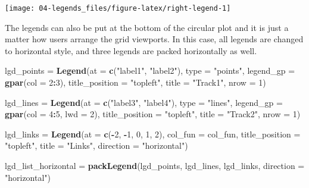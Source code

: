 \documentclass[]{book}
\newenvironment{Shaded}{\begin{snugshade}}{\end{snugshade}}
\newcommand{\KeywordTok}[1]{\textcolor[rgb]{0.13,0.29,0.53}{\textbf{#1}}}
\newcommand{\DataTypeTok}[1]{\textcolor[rgb]{0.13,0.29,0.53}{#1}}
\newcommand{\DecValTok}[1]{\textcolor[rgb]{0.00,0.00,0.81}{#1}}
\newcommand{\StringTok}[1]{\textcolor[rgb]{0.31,0.60,0.02}{#1}}
\newcommand{\OperatorTok}[1]{\textcolor[rgb]{0.81,0.36,0.00}{\textbf{#1}}}
\newcommand{\NormalTok}[1]{#1}
\theoremstyle{definition}
\theoremstyle{definition}
\theoremstyle{remark}
\begin{document}
\begin{center}\texttt{[image: 04-legends\_files/figure-latex/right-legend-1]} \end{center}

The legends can also be put at the bottom of the circular plot and it is
just a matter how users arrange the grid viewports. In this case, all
legends are changed to horizontal style, and three legends are packed
horizontally as well.

\begin{Shaded}
\begin{Highlighting}[]
\NormalTok{lgd_points =}\StringTok{ }\KeywordTok{Legend}\NormalTok{(}\DataTypeTok{at =} \KeywordTok{c}\NormalTok{(}\StringTok{"label1"}\NormalTok{, }\StringTok{"label2"}\NormalTok{), }\DataTypeTok{type =} \StringTok{"points"}\NormalTok{, }
    \DataTypeTok{legend_gp =} \KeywordTok{gpar}\NormalTok{(}\DataTypeTok{col =} \DecValTok{2}\OperatorTok{:}\DecValTok{3}\NormalTok{), }\DataTypeTok{title_position =} \StringTok{"topleft"}\NormalTok{, }
    \DataTypeTok{title =} \StringTok{"Track1"}\NormalTok{, }\DataTypeTok{nrow =} \DecValTok{1}\NormalTok{)}

\NormalTok{lgd_lines =}\StringTok{ }\KeywordTok{Legend}\NormalTok{(}\DataTypeTok{at =} \KeywordTok{c}\NormalTok{(}\StringTok{"label3"}\NormalTok{, }\StringTok{"label4"}\NormalTok{), }\DataTypeTok{type =} \StringTok{"lines"}\NormalTok{, }
    \DataTypeTok{legend_gp =} \KeywordTok{gpar}\NormalTok{(}\DataTypeTok{col =} \DecValTok{4}\OperatorTok{:}\DecValTok{5}\NormalTok{, }\DataTypeTok{lwd =} \DecValTok{2}\NormalTok{), }\DataTypeTok{title_position =} \StringTok{"topleft"}\NormalTok{, }
    \DataTypeTok{title =} \StringTok{"Track2"}\NormalTok{, }\DataTypeTok{nrow =} \DecValTok{1}\NormalTok{)}

\NormalTok{lgd_links =}\StringTok{ }\KeywordTok{Legend}\NormalTok{(}\DataTypeTok{at =} \KeywordTok{c}\NormalTok{(}\OperatorTok{-}\DecValTok{2}\NormalTok{, }\OperatorTok{-}\DecValTok{1}\NormalTok{, }\DecValTok{0}\NormalTok{, }\DecValTok{1}\NormalTok{, }\DecValTok{2}\NormalTok{), }\DataTypeTok{col_fun =}\NormalTok{ col_fun, }
    \DataTypeTok{title_position =} \StringTok{"topleft"}\NormalTok{, }\DataTypeTok{title =} \StringTok{"Links"}\NormalTok{, }\DataTypeTok{direction =} \StringTok{"horizontal"}\NormalTok{)}

\NormalTok{lgd_list_horizontal =}\StringTok{ }\KeywordTok{packLegend}\NormalTok{(lgd_points, lgd_lines, lgd_links, }
    \DataTypeTok{direction =} \StringTok{"horizontal"}\NormalTok{)}
\end{Highlighting}
\end{Shaded}
\end{document}

